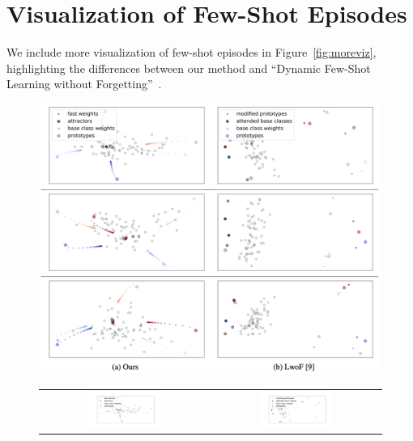 \section{Visualization of Few-Shot Episodes}
We include more visualization of few-shot episodes in Figure~\ref{fig:moreviz}, highlighting the differences between our method and ``Dynamic Few-Shot Learning without Forgetting''~\citep{lwof}.
\begin{figure}[h!]
\centering
\iflatexml
\includegraphics[width=6\textwidth]{figures/attractor_progress_app.png}
\else
\begin{minipage}[c]{\textwidth}
\begin{small}
\begin{tabular}{cc}
\includegraphics[width=0.45\textwidth,trim={2.8cm 1cm 2.5cm 1cm},clip]{figures/attractor_progress_0.pdf} & 
\includegraphics[width=0.45\textwidth,trim={2.8cm 1cm 2.5cm 1cm},clip]{figures/lwof_progress_0.pdf}\\

\end{tabular}
\end{small}
\end{minipage}
\end{figure}
